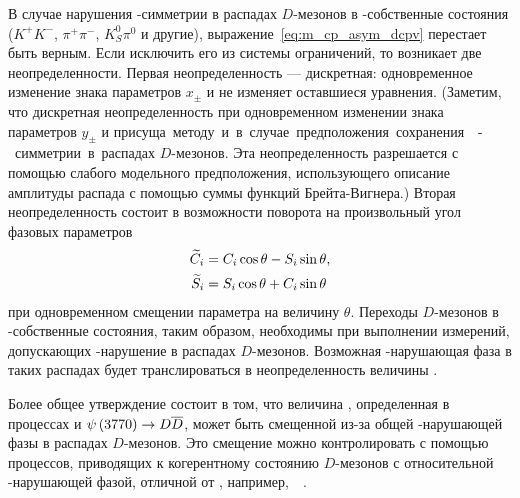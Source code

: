 В случае нарушения \cpconj-симметрии в распадах $D$-мезонов в \cpconj-собственные состояния ($K^+K^-$, $\pi^+\pi^-$, $K_S^0\pi^0$ и другие), выражение~\eqref{eq:m_cp_asym_dcpv} перестает быть верным.  Если исключить его из системы ограничений, то возникает две неопределенности.  Первая неопределенность --- дискретная: одновременное изменение знака параметров $x_{\pm}$ и \ci не изменяет оставшиеся уравнения.  (Заметим, что дискретная неопределенность при одновременном изменении знака параметров $y_{\pm}$ и \si присуща методу и 
в случае предположения сохранения \cpconj-симметрии в распадах $D$-мезонов.  Эта неопределенность разрешается с помощью слабого модельного предположения, использующего описание амплитуды распада \dnkpp с помощью суммы функций Брейта-Вигнера.)  Вторая неопределенность состоит в возможности поворота на произвольный угол фазовых параметров
\begin{equation}
\begin{split}
 \widetilde{C}_i &= C_i\cos\theta - S_i\sin\theta,\\
 \widetilde{S}_i &= S_i\cos\theta + C_i\sin\theta
\end{split}
\end{equation}
при одновременном смещении параметра \gphi на величину $\theta$.  Переходы $D$-мезонов в \cpconj-собственные состояния, таким образом, необходимы при выполнении измерений, допускающих \cpconj-нарушение в распадах $D$-мезонов.  Возможная \cpconj-нарушающая фаза в таких распадах будет транслироваться в неопределенность величины \gphi.  

Более общее утверждение состоит в том, что величина \gphi, определенная в процессах \bdk и $\psi\left(3770\right)\to D\overline{D}$, может быть смещенной из-за общей \cpconj-нарушающей фазы в распадах $D$-мезонов.  Это смещение можно контролировать с помощью процессов, приводящих к когерентному состоянию $D$-мезонов с относительной \cpconj-нарушающей фазой, отличной от \gphi, например,~\bdpi~\cite{bdpv_cpv}.

